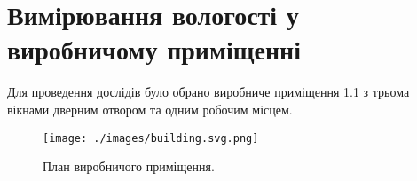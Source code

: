 \chapter{Вимірювання вологості у виробничому приміщенні}

Для проведення дослідів було обрано виробниче приміщення \ref{fig:building} з трьома вікнами дверним
отвором та одним робочим місцем.

\begin{figure} \centering
  \texttt{[image: ./images/building.svg.png]}
  \caption{План виробничого приміщення.}
  \label{fig:building}
\end{figure}